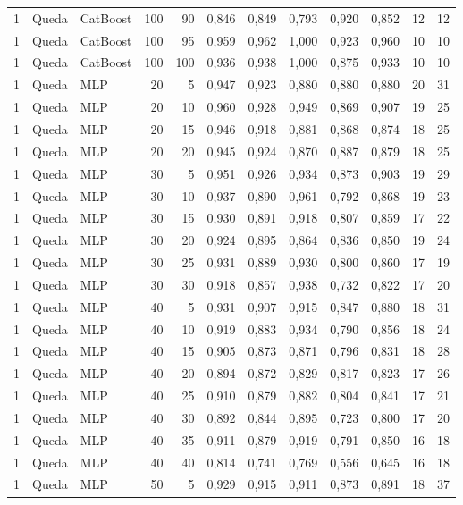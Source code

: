 \begin{longtable}{@{}rllrrrrrrrrr@{}}
1 & Queda & CatBoost & 100 & 90 & 0,846 & 0,849 & 0,793 & 0,920 & 0,852 & 12 & 12 \\
1 & Queda & CatBoost & 100 & 95 & 0,959 & 0,962 & 1,000 & 0,923 & 0,960 & 10 & 10 \\
1 & Queda & CatBoost & 100 & 100 & 0,936 & 0,938 & 1,000 & 0,875 & 0,933 & 10 & 10 \\
1 & Queda & MLP & 20 & 5 & 0,947 & 0,923 & 0,880 & 0,880 & 0,880 & 20 & 31 \\
1 & Queda & MLP & 20 & 10 & 0,960 & 0,928 & 0,949 & 0,869 & 0,907 & 19 & 25 \\
1 & Queda & MLP & 20 & 15 & 0,946 & 0,918 & 0,881 & 0,868 & 0,874 & 18 & 25 \\
1 & Queda & MLP & 20 & 20 & 0,945 & 0,924 & 0,870 & 0,887 & 0,879 & 18 & 25 \\
1 & Queda & MLP & 30 & 5 & 0,951 & 0,926 & 0,934 & 0,873 & 0,903 & 19 & 29 \\
1 & Queda & MLP & 30 & 10 & 0,937 & 0,890 & 0,961 & 0,792 & 0,868 & 19 & 23 \\
1 & Queda & MLP & 30 & 15 & 0,930 & 0,891 & 0,918 & 0,807 & 0,859 & 17 & 22 \\
1 & Queda & MLP & 30 & 20 & 0,924 & 0,895 & 0,864 & 0,836 & 0,850 & 19 & 24 \\
1 & Queda & MLP & 30 & 25 & 0,931 & 0,889 & 0,930 & 0,800 & 0,860 & 17 & 19 \\
1 & Queda & MLP & 30 & 30 & 0,918 & 0,857 & 0,938 & 0,732 & 0,822 & 17 & 20 \\
1 & Queda & MLP & 40 & 5 & 0,931 & 0,907 & 0,915 & 0,847 & 0,880 & 18 & 31 \\
1 & Queda & MLP & 40 & 10 & 0,919 & 0,883 & 0,934 & 0,790 & 0,856 & 18 & 24 \\
1 & Queda & MLP & 40 & 15 & 0,905 & 0,873 & 0,871 & 0,796 & 0,831 & 18 & 28 \\
1 & Queda & MLP & 40 & 20 & 0,894 & 0,872 & 0,829 & 0,817 & 0,823 & 17 & 26 \\
1 & Queda & MLP & 40 & 25 & 0,910 & 0,879 & 0,882 & 0,804 & 0,841 & 17 & 21 \\
1 & Queda & MLP & 40 & 30 & 0,892 & 0,844 & 0,895 & 0,723 & 0,800 & 17 & 20 \\
1 & Queda & MLP & 40 & 35 & 0,911 & 0,879 & 0,919 & 0,791 & 0,850 & 16 & 18 \\
1 & Queda & MLP & 40 & 40 & 0,814 & 0,741 & 0,769 & 0,556 & 0,645 & 16 & 18 \\
1 & Queda & MLP & 50 & 5 & 0,929 & 0,915 & 0,911 & 0,873 & 0,891 & 18 & 37 \\

\end{longtable}
